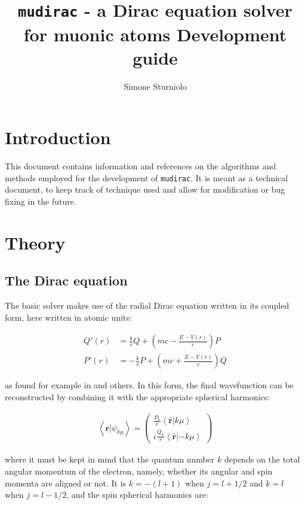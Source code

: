 \documentclass[]{report}
\title{\texttt{mudirac} - a Dirac equation solver for muonic atoms
	\newline
	\large Development guide}
\author{Simone Sturniolo}
\begin{document}
\maketitle

\chapter*{Introduction}

This document contains information and references on the algorithms and methods employed for the development of \texttt{mudirac}. It is meant as a technical document, to keep track of technique used and allow for modification or bug fixing in the future.

\chapter{Theory}

\section{The Dirac equation}

The basic solver makes use of the radial Dirac equation written in its coupled form, here written in atomic units:

\begin{align}\label{dirac_sys}
	Q'(r) &= \frac{k}{r}Q + \left(mc-\frac{E-V(r)}{c}\right)P \\
	P'(r) &= -\frac{k}{r}P + \left(mc+\frac{E-V(r)}{c}\right)Q
\end{align}

as found for example in \cite{weinb2008, silbar2010, gross1999} and others. In this form, the final wavefunction can be reconstructed by combining it with the appropriate spherical harmonics:

\begin{align}\label{dirac_wavef}
\left<\mathbf{r}|\psi_{k\mu}\right> = \begin{pmatrix}
\frac{P_k}{r}\left<\mathbf{\hat{r}}|k\mu\right> \\
i\frac{Q_k}{r}\left<\mathbf{\hat{r}}|-k\mu\right>
\end{pmatrix}
\end{align}

where it must be kept in mind that the quantum number $k$ depends on the total angular momentum of the electron, namely, whether its angular and spin momenta are aligned or not. It is $k=-(l+1)$ when $j = l+1/2$ and $k=l$ when $j=l-1/2$, and the spin spherical harmonics are:
\end{document}
